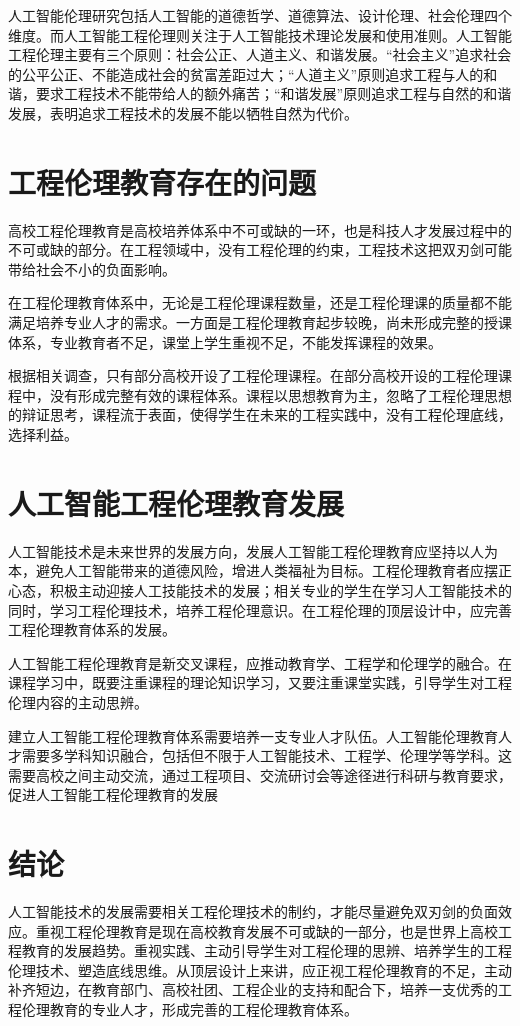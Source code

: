 \documentclass{ctexart}
\begin{document}
人工智能伦理研究包括人工智能的道德哲学、道德算法、设计伦理、社会伦理四个维度。而人工智能工程伦理则关注于人工智能技术理论发展和使用准则。人工智能工程伦理主要有三个原则：社会公正、人道主义、和谐发展。“社会主义”追求社会的公平公正、不能造成社会的贫富差距过大；“人道主义”原则追求工程与人的和谐，要求工程技术不能带给人的额外痛苦；“和谐发展”原则追求工程与自然的和谐发展，表明追求工程技术的发展不能以牺牲自然为代价。

\section{工程伦理教育存在的问题}
高校工程伦理教育是高校培养体系中不可或缺的一环，也是科技人才发展过程中的不可或缺的部分。在工程领域中，没有工程伦理的约束，工程技术这把双刃剑可能带给社会不小的负面影响。

在工程伦理教育体系中，无论是工程伦理课程数量，还是工程伦理课的质量都不能满足培养专业人才的需求。一方面是工程伦理教育起步较晚，尚未形成完整的授课体系，专业教育者不足，课堂上学生重视不足，不能发挥课程的效果。

根据相关调查，只有部分高校开设了工程伦理课程。在部分高校开设的工程伦理课程中，没有形成完整有效的课程体系。课程以思想教育为主，忽略了工程伦理思想的辩证思考，课程流于表面，使得学生在未来的工程实践中，没有工程伦理底线，选择利益。

\section{人工智能工程伦理教育发展}
人工智能技术是未来世界的发展方向，发展人工智能工程伦理教育应坚持以人为本，避免人工智能带来的道德风险，增进人类福祉为目标。工程伦理教育者应摆正心态，积极主动迎接人工技能技术的发展；相关专业的学生在学习人工智能技术的同时，学习工程伦理技术，培养工程伦理意识。在工程伦理的顶层设计中，应完善工程伦理教育体系的发展。

人工智能工程伦理教育是新交叉课程，应推动教育学、工程学和伦理学的融合。在课程学习中，既要注重课程的理论知识学习，又要注重课堂实践，引导学生对工程伦理内容的主动思辨。

建立人工智能工程伦理教育体系需要培养一支专业人才队伍。人工智能伦理教育人才需要多学科知识融合，包括但不限于人工智能技术、工程学、伦理学等学科。这需要高校之间主动交流，通过工程项目、交流研讨会等途径进行科研与教育要求，促进人工智能工程伦理教育的发展

\section{结论}
人工智能技术的发展需要相关工程伦理技术的制约，才能尽量避免双刃剑的负面效应。重视工程伦理教育是现在高校教育发展不可或缺的一部分，也是世界上高校工程教育的发展趋势。重视实践、主动引导学生对工程伦理的思辨、培养学生的工程伦理技术、塑造底线思维。从顶层设计上来讲，应正视工程伦理教育的不足，主动补齐短边，在教育部门、高校社团、工程企业的支持和配合下，培养一支优秀的工程伦理教育的专业人才，形成完善的工程伦理教育体系。
\end{document}
